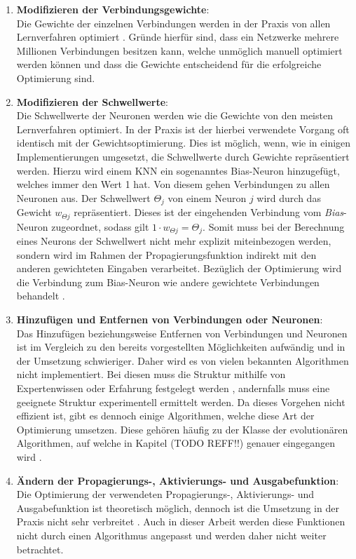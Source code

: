 \begin{enumerate}
	\item \textbf{Modifizieren der Verbindungsgewichte}:\\
	Die Gewichte der einzelnen Verbindungen werden in der Praxis von allen Lernverfahren optimiert \cite{zell2003simulation}. Gründe hierfür sind, dass ein Netzwerke mehrere Millionen Verbindungen besitzen kann, welche unmöglich manuell optimiert werden können und dass die Gewichte entscheidend für die erfolgreiche Optimierung sind.

	\item\textbf{Modifizieren der Schwellwerte}:\\
	Die Schwellwerte der Neuronen werden wie die Gewichte von den meisten Lernverfahren optimiert. In der Praxis ist der hierbei verwendete Vorgang oft identisch mit der Gewichtsoptimierung. Dies ist möglich, wenn, wie in einigen Implementierungen umgesetzt, die Schwellwerte durch Gewichte repräsentiert werden. Hierzu wird einem \ac{KNN} ein sogenanntes Bias-Neuron hinzugefügt, welches immer den Wert 1 hat. Von diesem gehen Verbindungen zu allen Neuronen aus. Der Schwellwert $\Theta_j$ von einem Neuron $j$ wird durch das Gewicht $w_{\Theta j}$ repräsentiert. Dieses ist der eingehenden Verbindung vom \emph{Bias}-Neuron zugeordnet, sodass gilt $1\cdot w_{\Theta j} = \Theta_j$. Somit muss bei der Berechnung eines Neurons der Schwellwert nicht mehr explizit miteinbezogen werden, sondern wird im Rahmen der Propagierungsfunktion indirekt mit den anderen gewichteten Eingaben verarbeitet. Bezüglich der Optimierung wird die Verbindung zum Bias-Neuron wie andere gewichtete Verbindungen behandelt \cite{zell2003simulation}.
	\item \textbf{Hinzufügen und Entfernen von Verbindungen oder Neuronen}:\\
	Das Hinzufügen beziehungsweise Entfernen von Verbindungen und Neuronen ist im Vergleich zu den bereits vorgestellten Möglichkeiten aufwändig und in der Umsetzung schwieriger. Daher wird es von vielen bekannten Algorithmen nicht implementiert. Bei diesen muss die Struktur mithilfe von Expertenwissen oder Erfahrung festgelegt werden \cite{stanley2017oreilly}, andernfalls muss eine geeignete Struktur experimentell ermittelt werden. Da dieses Vorgehen nicht effizient ist, gibt es dennoch einige Algorithmen, welche diese Art der Optimierung umsetzen. Diese gehören häufig zu der Klasse der evolutionären Algorithmen, auf welche in Kapitel (TODO REFF!!) genauer eingegangen wird \cite{kriesel2008kleiner}.
	
	\item \textbf{Ändern der Propagierungs-, Aktivierungs- und Ausgabefunktion}:\\
	Die Optimierung der verwendeten Propagierungs-, Aktivierungs- und Ausgabefunktion ist theoretisch möglich, dennoch ist die Umsetzung in der Praxis nicht sehr verbreitet \cite{zell2003simulation}. Auch in dieser Arbeit werden diese Funktionen nicht durch einen Algorithmus angepasst und werden daher nicht weiter betrachtet. 
\end{enumerate}

